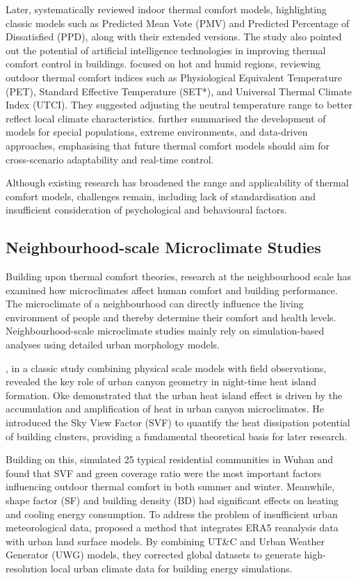 Later, \citet{enescu2017review} systematically reviewed indoor thermal comfort models, highlighting classic models such as Predicted Mean Vote (PMV) and Predicted Percentage of Dissatisfied (PPD), along with their extended versions. The study also pointed out the potential of artificial intelligence technologies in improving thermal comfort control in buildings. \citet{binarti2020review} focused on hot and humid regions, reviewing outdoor thermal comfort indices such as Physiological Equivalent Temperature (PET), Standard Effective Temperature (SET*), and Universal Thermal Climate Index (UTCI). They suggested adjusting the neutral temperature range to better reflect local climate characteristics. \citet{zhao2021thermal} further summarised the development of models for special populations, extreme environments, and data-driven approaches, emphasising that future thermal comfort models should aim for cross-scenario adaptability and real-time control.

Although existing research has broadened the range and applicability of thermal comfort models, challenges remain, including lack of standardisation and insufficient consideration of psychological and behavioural factors.

\subsection{Neighbourhood-scale Microclimate Studies}

Building upon thermal comfort theories, research at the neighbourhood scale has examined how microclimates affect human comfort and building performance. The microclimate of a neighbourhood can directly influence the living environment of people and thereby determine their comfort and health levels. Neighbourhood-scale microclimate studies mainly rely on simulation-based analyses using detailed urban morphology models.

\citet{oke1981canyon}, in a classic study combining physical scale models with field observations, revealed the key role of urban canyon geometry in night-time heat island formation. Oke demonstrated that the urban heat island effect is driven by the accumulation and amplification of heat in urban canyon microclimates. He introduced the Sky View Factor (SVF) to quantify the heat dissipation potential of building clusters, providing a fundamental theoretical basis for later research.

Building on this, \citet{wang2025impact} simulated 25 typical residential communities in Wuhan and found that SVF and green coverage ratio were the most important factors influencing outdoor thermal comfort in both summer and winter. Meanwhile, shape factor (SF) and building density (BD) had significant effects on heating and cooling energy consumption. To address the problem of insufficient urban meteorological data, \citet{zheng2025reanalysis} proposed a method that integrates ERA5 reanalysis data with urban land surface models. By combining UT\&C and Urban Weather Generator (UWG) models, they corrected global datasets to generate high-resolution local urban climate data for building energy simulations.

